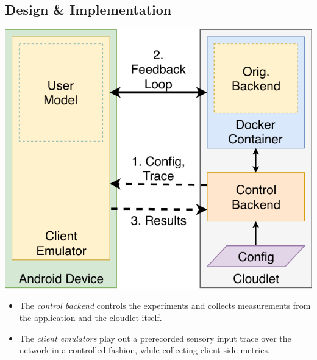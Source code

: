 \documentclass[portrait, a1]{KTHEEposter}
\begin{document}
\begin{pcolumns}[3]
\begin{pcolumn}[2]
\begin{pframe}[1.1]
                \section{Design \& Implementation}
                \begin{center}
                    \medskip
                    \includegraphics[width=\linewidth]{img/TraceReplay_GenArch}
                    \medskip
                \end{center}

                \begin{itemize}
                    \item The \emph{control backend} controls the experiments and collects measurements from the application and the cloudlet itself.
                    \item The \emph{client emulators} play out a prerecorded sensory input trace over the network in a controlled fashion, while collecting client-side metrics.
                \end{itemize}
            

\end{pframe}
\end{pcolumn}
\end{pcolumns}
\end{document}
